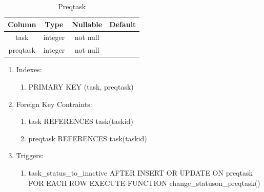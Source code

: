 \documentclass[conference,onecolumn]{IEEEtran}
\begin{document}
\begin{table}[htbp]
  \caption{Preqtask}
  \begin{center}
    \begin{tabular}{|c|c|c|c|}
      \hline
      \textbf{Column} & \textbf{Type} & \textbf{Nullable} & \textbf{Default}\\
      \hline
      task & integer & not null &\\
      preqtask & integer & not null &\\
      \hline
    \end{tabular}
    \begin{enumerate}
    \item Indexes:
      \begin{enumerate}
      \item PRIMARY KEY (task, preqtask)
      \end{enumerate}
    \item Foreign Key Contraints:
      \begin{enumerate}
      \item task REFERENCES task(taskid)
      \item preqtask REFERENCES task(taskid)
      \end{enumerate}
    \item Triggers:
      \begin{enumerate}
        \item task\_status\_to\_inactive AFTER INSERT OR UPDATE ON preqtask FOR EACH ROW EXECUTE FUNCTION change\_statuson\_preqtask()
      \end{enumerate}
    \end{enumerate}
    \label{preqtask}
  \end{center}
\end{table}
\end{document}
